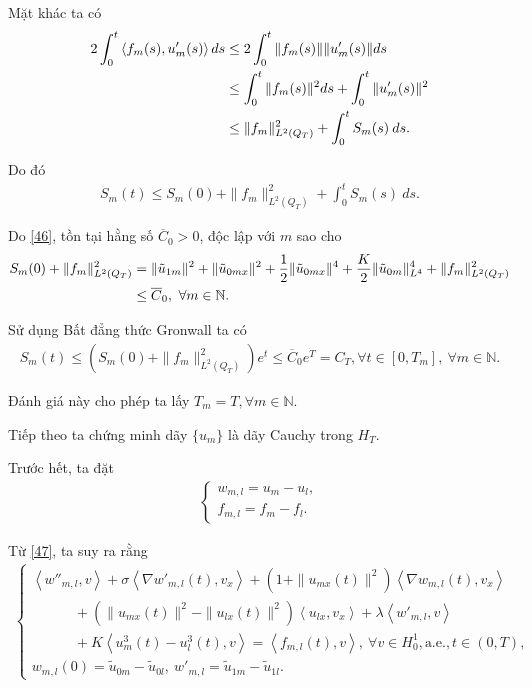 \documentclass[12pt,a4paper]{article}
\def\N{\mathbb{N}}
\theoremstyle{definition}
\theoremstyle{definition}
\begin{document}
Mặt khác ta có
\begin{align}
    2 \int_0^t \left<f_m(s), u'_m(s)\right> ds
    &\le 2 \int_0^t \|f_m(s)\| \|u'_m(s)\| ds \\
    &\le \int_0^t \|f_m(s)\|^2 ds + \int_0^t \|u'_m(s)\|^2 \notag \\
    &\le \|f_m\|^2_{L^2(Q_T)} + \int_0^t S_m(s)\:ds. \notag 
\end{align}

Do đó
\begin{align}
    S_m(t) \le S_m(0) + \|f_m\|^2_{L^2(Q_T)} + \int_0^t S_m(s)\:ds.
\end{align}

Do \eqref{46}, tồn tại hằng số $\overline{C}_0 > 0$, độc lập với $m$ sao cho
\begin{align}
    S_m(0) + \|f_m\|^2_{L^2(Q_T)} &= \|\tilde{u}_{1m}\|^2 + \|\tilde{u}_{0mx}\|^2 + \frac{1}{2}\|\tilde{u}_{0mx}\|^4 + \frac{K}{2} \|\tilde{u}_{0m}\|^4_{L^4} + \|f_m\|^2_{L^2(Q_T)} \notag \\
    &\le \overline{C}_0,\ \forall m \in \N. 
\end{align}

Sử dụng Bất đẳng thức Gronwall ta có
\begin{align} \label{414}
    S_m(t) \le \left(S_m(0) + \|f_m\|^2_{L^2(Q_T)}\right) e^t \le \overline{C}_0 e^T = C_T, \forall t \in [0,T_m],\ \forall m \in \N.
\end{align}

Đánh giá này cho phép ta lấy $T_m = T, \forall m \in \N$.

Tiếp theo ta chứng minh dãy $\{u_m\}$ là dãy Cauchy trong $H_T$.

Trước hết, ta đặt
\begin{align}
\begin{cases}
    w_{m,l} = u_m - u_l, \\
    f_{m,l} = f_m - f_l.
\end{cases}
\end{align}

Từ \eqref{47}, ta suy ra rằng
\begin{align} \label{416}
\begin{cases}
    \left< w''_{m,l}, v \right>
    + \sigma \left< \nabla w'_{m,l}(t), v_x \right> + \left(1 + \|u_{mx}(t)\|^2\right) \left< \nabla w_{m,l}(t), v_x \right>\\
    \quad\quad\quad + \left(\|u_{mx}(t)\|^2 - \|u_{lx}(t)\|^2\right) \left<u_{lx},v_x\right>
    + \lambda \left<w'_{m,l}, v \right> \\
    \quad\quad\quad + K \left< u_m^3(t) - u_l^3(t), v \right>
    = \left< f_{m,l}(t), v \right>,\ \forall v \in H^1_0, \text{a.e.}, t \in (0,T), \\
    w_{m,l}(0) = \tilde{u}_{0m} - \tilde{u}_{0l}, \: w'_{m,l} = \tilde{u}_{1m} - \tilde{u}_{1l}.
\end{cases}
\end{align}
\end{document}
